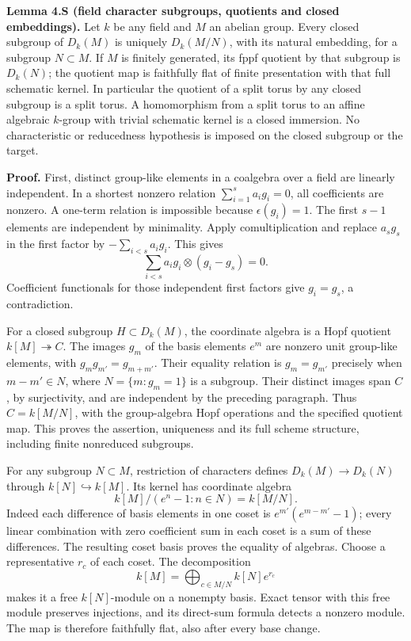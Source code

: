 \documentclass[11pt,a4paper,openany]{report}
\newcounter{none}
\begin{document}
\label{AG-RG-01-field-character-subgroups-and-quotients}

\textbf{Lemma 4.S (field character subgroups, quotients and closed embeddings).} Let \(k\) be any field and \(M\) an abelian group. Every closed subgroup of \(D_k(M)\) is uniquely \(D_k(M/N)\), with its natural embedding, for a subgroup \(N\subset M\). If \(M\) is finitely generated, its fppf quotient by that subgroup is \(D_k(N)\); the quotient map is faithfully flat of finite presentation with that full schematic kernel. In particular the quotient of a split torus by any closed subgroup is a split torus. A homomorphism from a split torus to an affine algebraic \(k\)-group with trivial schematic kernel is a closed immersion. No characteristic or reducedness hypothesis is imposed on the closed subgroup or the target.

\textbf{Proof.} First, distinct group-like elements in a coalgebra over a field are linearly independent. In a shortest nonzero relation \(\sum_{i=1}^s a_i g_i=0\), all coefficients are nonzero. A one-term relation is impossible because \(\epsilon(g_i)=1\). The first \(s-1\) elements are independent by minimality. Apply comultiplication and replace \(a_sg_s\) in the first factor by \(-\sum_{i<s}a_i g_i\). This gives \[
 \sum_{i<s}a_i g_i\otimes(g_i-g_s)=0.
\] Coefficient functionals for those independent first factors give \(g_i=g_s\), a contradiction.

For a closed subgroup \(H\subset D_k(M)\), the coordinate algebra is a Hopf quotient \(k[M]\twoheadrightarrow C\). The images \(g_m\) of the basis elements \(e^m\) are nonzero unit group-like elements, with \(g_mg_{m'}=g_{m+m'}\). Their equality relation is \(g_m=g_{m'}\) precisely when \(m-m'\in N\), where \(N=\{m:g_m=1\}\) is a subgroup. Their distinct images span \(C\), by surjectivity, and are independent by the preceding paragraph. Thus \(C=k[M/N]\), with the group-algebra Hopf operations and the specified quotient map. This proves the assertion, uniqueness and its full scheme structure, including finite nonreduced subgroups.

For any subgroup \(N\subset M\), restriction of characters defines \(D_k(M)\to D_k(N)\) through \(k[N]\hookrightarrow k[M]\). Its kernel has coordinate algebra \[
 k[M]/(e^n-1:n\in N)=k[M/N].
\] Indeed each difference of basis elements in one coset is \(e^{m'}(e^{m-m'}-1)\); every linear combination with zero coefficient sum in each coset is a sum of these differences. The resulting coset basis proves the equality of algebras. Choose a representative \(r_c\) of each coset. The decomposition \[
 k[M]=\bigoplus_{c\in M/N}k[N]e^{r_c}
\] makes it a free \(k[N]\)-module on a nonempty basis. Exact tensor with this free module preserves injections, and its direct-sum formula detects a nonzero module. The map is therefore faithfully flat, also after every base change.
\end{document}
